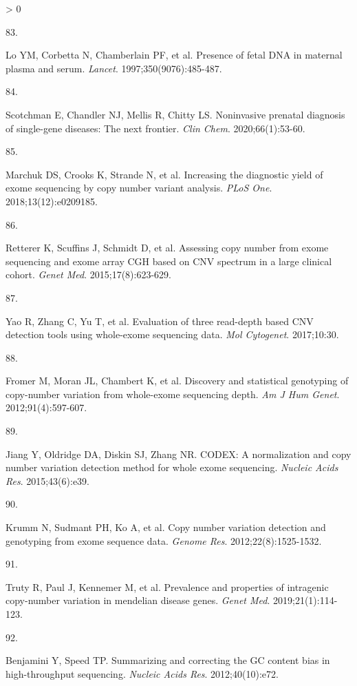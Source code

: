 \documentclass[11pt,letterpaper,oneside]{book}
\newlength{\cslhangindent}
\newlength{\csllabelwidth}
\newenvironment{CSLReferences}[3] %
 {%
  \setlength{\parindent}{0pt}
  \ifodd #1 \everypar{\setlength{\hangindent}{\cslhangindent}}\ignorespaces\fi
  \ifnum #2 > 0
  \setlength{\parskip}{#2\baselineskip}
  \fi
 }%
 {}
\newcommand{\CSLLeftMargin}[1]{\parbox[t]{\maxof{\widthof{#1}}{\csllabelwidth}}{#1}}
\newcommand{\CSLRightInline}[1]{\parbox[t]{\linewidth-\csllabelwidth}{#1}\newline}
\begin{document}
\begin{CSLReferences}{0}{0}
\leavevmode\hypertarget{ref-lo:1997aa}{}%
\CSLLeftMargin{83. }
\CSLRightInline{Lo YM, Corbetta N, Chamberlain PF, et al. Presence of fetal DNA in maternal plasma and serum. \emph{Lancet}. 1997;350(9076):485-487.}

\leavevmode\hypertarget{ref-scotchman:2020aa}{}%
\CSLLeftMargin{84. }
\CSLRightInline{Scotchman E, Chandler NJ, Mellis R, Chitty LS. Noninvasive prenatal diagnosis of single-gene diseases: The next frontier. \emph{Clin Chem}. 2020;66(1):53-60.}

\leavevmode\hypertarget{ref-marchuk:2018aa}{}%
\CSLLeftMargin{85. }
\CSLRightInline{Marchuk DS, Crooks K, Strande N, et al. Increasing the diagnostic yield of exome sequencing by copy number variant analysis. \emph{PLoS One}. 2018;13(12):e0209185.}

\leavevmode\hypertarget{ref-retterer:2015aa}{}%
\CSLLeftMargin{86. }
\CSLRightInline{Retterer K, Scuffins J, Schmidt D, et al. Assessing copy number from exome sequencing and exome array CGH based on CNV spectrum in a large clinical cohort. \emph{Genet Med}. 2015;17(8):623-629.}

\leavevmode\hypertarget{ref-yao:2017aa}{}%
\CSLLeftMargin{87. }
\CSLRightInline{Yao R, Zhang C, Yu T, et al. Evaluation of three read-depth based CNV detection tools using whole-exome sequencing data. \emph{Mol Cytogenet}. 2017;10:30.}

\leavevmode\hypertarget{ref-fromer:2012aa}{}%
\CSLLeftMargin{88. }
\CSLRightInline{Fromer M, Moran JL, Chambert K, et al. Discovery and statistical genotyping of copy-number variation from whole-exome sequencing depth. \emph{Am J Hum Genet}. 2012;91(4):597-607.}

\leavevmode\hypertarget{ref-jiang:2015aa}{}%
\CSLLeftMargin{89. }
\CSLRightInline{Jiang Y, Oldridge DA, Diskin SJ, Zhang NR. CODEX: A normalization and copy number variation detection method for whole exome sequencing. \emph{Nucleic Acids Res}. 2015;43(6):e39.}

\leavevmode\hypertarget{ref-krumm:2012aa}{}%
\CSLLeftMargin{90. }
\CSLRightInline{Krumm N, Sudmant PH, Ko A, et al. Copy number variation detection and genotyping from exome sequence data. \emph{Genome Res}. 2012;22(8):1525-1532.}

\leavevmode\hypertarget{ref-truty:2019aa}{}%
\CSLLeftMargin{91. }
\CSLRightInline{Truty R, Paul J, Kennemer M, et al. Prevalence and properties of intragenic copy-number variation in mendelian disease genes. \emph{Genet Med}. 2019;21(1):114-123.}

\leavevmode\hypertarget{ref-benjamini:2012aa}{}%
\CSLLeftMargin{92. }
\CSLRightInline{Benjamini Y, Speed TP. Summarizing and correcting the GC content bias in high-throughput sequencing. \emph{Nucleic Acids Res}. 2012;40(10):e72.}


\end{CSLReferences}
\end{document}
